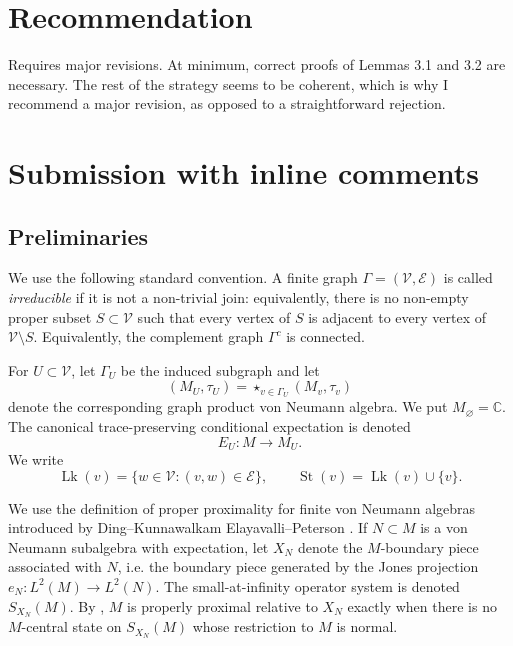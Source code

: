\documentclass[12pt]{article}
\theoremstyle{definition}
\newcommand{\V}{\mathcal V}
\newcommand{\E}{\mathcal E}
\newcommand{\Lk}{\operatorname{Lk}}
\newcommand{\St}{\operatorname{St}}
\newcommand{\C}{\mathbb C}
\begin{document}
\section{Recommendation}

 Requires major revisions. At minimum, correct proofs of Lemmas 3.1 and 3.2 are necessary. The rest of the strategy seems to be coherent, which is why I recommend a major revision, as opposed to a straightforward rejection.


  \section{Submission with inline comments}


\date{}




\begin{abstract}
We prove that if $\Gamma$ is a finite join-irreducible simplicial graph with at least three vertices and if each tracial vertex algebra $(M_v,\tau_v)$ contains a trace-zero unitary, then the tracial graph product von Neumann algebra is properly proximal.
\end{abstract}

\subsection{Preliminaries}

We use the following standard convention.  A finite graph $\Gamma=(\V,\E)$ is called \emph{irreducible} if it is not a non-trivial join: equivalently, there is no non-empty proper subset $S\subset \V$ such that every vertex of $S$ is adjacent to every vertex of $\V\setminus S$.  Equivalently, the complement graph $\Gamma^c$ is connected.

For $U\subset \V$, let $\Gamma_U$ be the induced subgraph and let
\[
(M_U,\tau_U)=\mathop{\star}_{v\in \Gamma_U}(M_v,\tau_v)
\]
denote the corresponding graph product von Neumann algebra.  We put $M_\varnothing=\C$.  The canonical trace-preserving conditional expectation is denoted
\[
E_U:M\to M_U.
\]
We write
\[
\Lk(v)=\{w\in \V: (v,w)\in \E\},
\qquad
\St(v)=\Lk(v)\cup\{v\}.
\]

We use the definition of proper proximality for finite von Neumann algebras introduced by Ding--Kunnawalkam Elayavalli--Peterson \cite{DKEP}.  If $N\subset M$ is a von Neumann subalgebra with expectation, let $X_N$ denote the $M$-boundary piece associated with $N$, i.e. the boundary piece generated by the Jones projection $e_N:L^2(M)\to L^2(N)$.  The small-at-infinity operator system is denoted $S_{X_N}(M)$.  By \cite[Theorems 6.2 and 8.5]{DKEP}, $M$ is properly proximal relative to $X_N$ exactly when there is no $M$-central state on $S_{X_N}(M)$ whose restriction to $M$ is normal.
\end{document}

